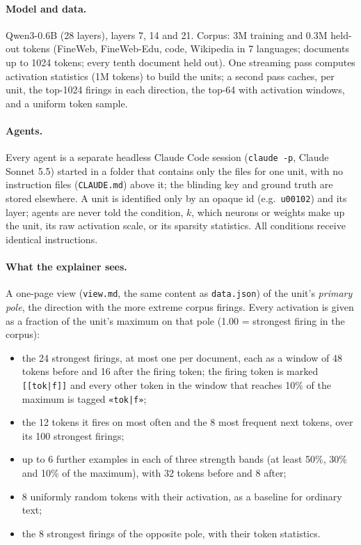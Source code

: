 \documentclass[11pt]{article}
\begin{document}
\paragraph{Model and data.} Qwen3-0.6B (28 layers), layers 7, 14 and 21. Corpus: 3M training and 0.3M held-out
tokens (FineWeb, FineWeb-Edu, code, Wikipedia in 7 languages; documents up to 1024 tokens; every tenth document held
out). One streaming pass computes activation statistics (1M tokens) to build the units; a second pass caches, per
unit, the top-1024 firings in each direction, the top-64 with activation windows, and a uniform token sample.

\paragraph{Agents.} Every agent is a separate headless Claude Code session (\texttt{claude -p}, Claude Sonnet 5.5)
started in a folder that contains only the files for one unit, with no instruction files (\texttt{CLAUDE.md}) above it;
the blinding key and ground truth are stored elsewhere. A unit is identified only by an opaque id (e.g.\
\texttt{u00102}) and its layer; agents are never told the condition, $k$, which neurons or weights make up the unit,
its raw activation scale, or its sparsity statistics. All conditions receive identical instructions.

\paragraph{What the explainer sees.} A one-page view (\texttt{view.md}, the same content as \texttt{data.json}) of
the unit's \emph{primary pole}, the direction with the more extreme corpus firings. Every activation is given as a
fraction of the unit's maximum on that pole (1.00 = strongest firing in the corpus):
\begin{itemize}
\item the 24 strongest firings, at most one per document, each as a window of 48 tokens before and 16 after the
firing token; the firing token is marked \texttt{[[tok|f]]} and every other token in the window that reaches 10\% of
the maximum is tagged \texttt{«tok|f»};
\item the 12 tokens it fires on most often and the 8 most frequent next tokens, over its 100 strongest firings;
\item up to 6 further examples in each of three strength bands (at least 50\%, 30\% and 10\% of the maximum), with
32 tokens before and 8 after;
\item 8 uniformly random tokens with their activation, as a baseline for ordinary text;
\item the 8 strongest firings of the opposite pole, with their token statistics.
\end{itemize}
\end{document}
